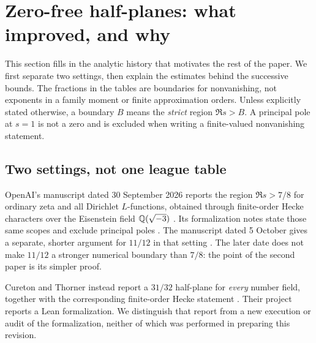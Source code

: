 \section{Zero-free half-planes: what improved, and why}\label{sec:progression}

This section fills in the analytic history that motivates the rest of the paper. We first separate two settings, then explain the estimates behind the successive bounds. The fractions in the tables are boundaries for nonvanishing, not exponents in a family moment or finite approximation orders. Unless explicitly stated otherwise, a boundary $B$ means the \emph{strict} region $\Re s>B$. A principal pole at $s=1$ is not a zero and is excluded when writing a finite-valued nonvanishing statement.

\subsection{Two settings, not one league table}

OpenAI's manuscript dated 30 September 2026 reports the region $\Re s>7/8$ for ordinary zeta and all Dirichlet $L$-functions, obtained through finite-order Hecke characters over the Eisenstein field $\mathbb Q(\sqrt{-3})$ \cite{OAI30}. Its formalization notes state those same scopes and exclude principal poles \cite{OAIScope}. The manuscript dated 5 October gives a separate, shorter argument for $11/12$ in that setting \cite{OAI05}. The later date does not make $11/12$ a stronger numerical boundary than $7/8$: the point of the second paper is its simpler proof.

Cureton and Thorner instead report a $31/32$ half-plane for \emph{every} number field, together with the corresponding finite-order Hecke statement \cite{CT26}. Their project reports a Lean formalization. We distinguish that report from a new execution or audit of the formalization, neither of which was performed in preparing this revision.

